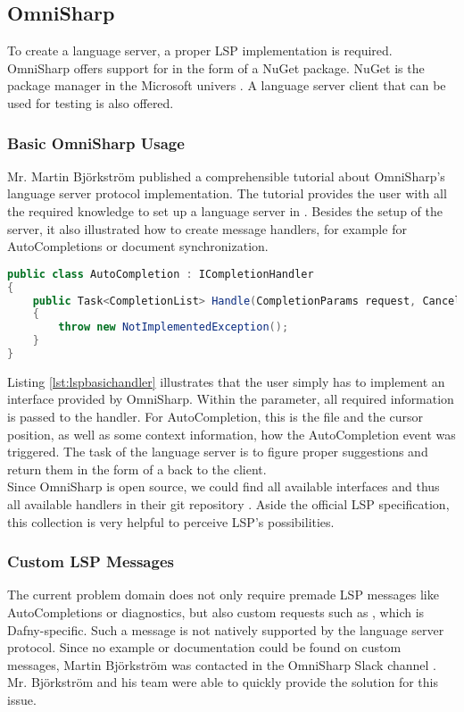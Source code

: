\subsection{OmniSharp}
\label{section:analysis:omnisharp}
To create a language server, a proper LSP implementation is required.
OmniSharp offers support for \CsharpWithSpace \cite{langserverdotorg} in the form of a NuGet package. 
NuGet is the package manager in the Microsoft univers \cite{nuget}.
A language server client that can be used for testing is also offered.

\subsubsection{Basic OmniSharp Usage}
Mr. Martin Bj\"orkstr\"om published a comprehensible tutorial about OmniSharp's language server protocol implementation.
The tutorial provides the user with all the required knowledge to set up a language server in \Csharp.
Besides the setup of the server, it also illustrated how to create message handlers, for example for AutoCompletions or document synchronization.\\

\begin{lstlisting}[language=csharp, caption={LSP Handler Implementation}, captionpos=b, label={lst:lspbasichandler}]
public class AutoCompletion : ICompletionHandler
{
    public Task<CompletionList> Handle(CompletionParams request, CancellationToken cancellationToken)
    {
        throw new NotImplementedException();
    }
}
\end{lstlisting}

Listing \ref{lst:lspbasichandler} illustrates that the user simply has to implement an interface provided by OmniSharp.
Within the  parameter, all required information is passed to the handler.
For AutoCompletion, this is the file and the cursor position, as well as some context information, how the AutoCompletion event was triggered.
The task of the language server is to figure proper suggestions and return them in the form of a  back to the client.\\

Since OmniSharp is open source, we could find all available interfaces and thus all available handlers in their git repository \cite{omnisharpgit}.
Aside the official LSP specification, this collection is very helpful to perceive LSP's possibilities.

\subsubsection{Custom LSP Messages}
\label{chapter:customlspmsg}
The current problem domain does not only require premade LSP messages like AutoCompletions or diagnostics, but also custom requests such as , which is Dafny-specific.
Such a message is not natively supported by the language server protocol.
Since no example or documentation could be found on custom messages, Martin Bj\"orkstr\"om was contacted in the OmniSharp Slack channel \cite{omnisharpslack}.
Mr. Bj\"orkstr\"om and his team were able to quickly provide the solution for this issue.\\

